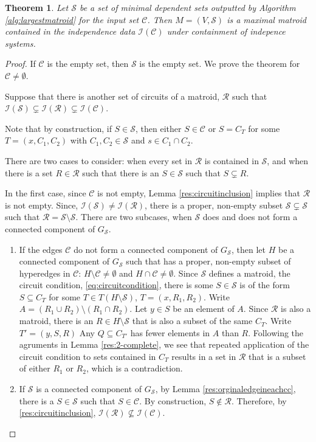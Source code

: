 \documentclass[11pt]{article}
\newcommand{\sI}{\mathscr{I}}
\newcommand{\sC}{\mathscr{C}}
\newcommand{\cS}{\mathcal{S}}
\newcommand{\sR}{\mathscr{R}}
\newcommand{\sS}{\mathscr{S}}
\newtheorem{thm}{Theorem}[section]
\theoremstyle{remark}
\theoremstyle{definition}
\begin{document}
\begin{thm}
    Let $\sS$ be a set of minimal dependent sets outputted by Algorithm \ref{alg:largestmatroid} for the input set $\sC$. Then $M = (V, \sS)$ is a maximal matroid contained in the independence data $\sI(\sC)$ under containment of indepence systems. 
\end{thm}
\begin{proof}
    If $\sC$ is the empty set, then $\sS$ is the empty set. We prove the theorem for $\sC \neq \emptyset$.
    
    Suppose that there is another set of circuits of a matroid, $\sR$ such that $\sI(\sS) \subsetneq \sI(\sR) \subsetneq \sI(\sC)$. 

    Note that by construction, if $S \in \sS$, then either $S \in \sC$ or $S = C_T$ for some $T = (x, C_1, C_2)$ with $C_1, C_2 \in \sS$ and $s \in C_1 \cap C_2$.

    There are two cases to consider: when every set in $\sR$ is contained in $\sS$, and when there is a set $R \in \sR$ such that there is an $S \in \sS$ such that $S \subsetneq R$.

    In the first case, since $\sC$ is not empty, Lemma \ref{res:circuitinclusion} implies that $\sR$ is not empty. Since, $\sI(\sS) \neq \sI(\sR)$, there is a proper, non-empty subset $\cS \subsetneq \sS$ such that $\sR = \sS \setminus \cS$. There are two subcases, when $\cS$ does and does not form a connected component of $G_\sS$. 
    \begin{enumerate}
        \item If the edges $\sC$ do not form a connected component of $G_\sS$, then let $H$ be a connected component of $G_\sS$ such that has a proper, non-empty subset of hyperedges in $\sC$: $H \setminus \sC \neq \emptyset$ and $H \cap \sC \neq \emptyset$. Since $\sS$ defines a matroid, the circuit condition, \eqref{eq:circuitcondition}, there is some $S \in \cS$ is of the form $S \subseteq C_T$ for some $T \in T(H\setminus \cS)$, $T = (x, R_1, R_2)$.  Write $A  = (R_1 \cup R_2) \setminus (R_1 \cap R_2)$. Let $y \in S$ be an element of $A$. Since $\sR$ is also a matroid, there is an $R \in H\setminus \cS$ that is also a subset of the same $C_T$. Write $T' = (y, S, R)$ Any $Q \subseteq C_{T'}$ has fewer elements in $A$ than $R$. Following the agruments in Lemma \ref{res:2-complete}, we see that repeated application of the circuit condition to sets contained in $C_T$ results in a set in $\sR$ that is a subset of either $R_1$ or $R_2$, which is a contradiction.
        \item If $\cS$ is a connected component of $G_\sS$, by Lemma \ref{res:orginaledgeineachcc}, there is a $S \in \cS$ such that $S \in \sC$. By construction, $S \not \in \sR$. Therefore, by \ref{res:circuitinclusion}, $\sI(\sR) \not \subseteq \sI(\sC)$. \end{enumerate}
    

\end{proof}
\end{document}
